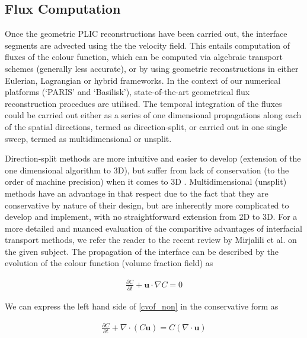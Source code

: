 \subsection*{Flux Computation}
Once the geometric PLIC reconstructions have been carried out, 
the interface segments are advected using the the velocity field. 
This entails computation of fluxes of the colour function, which 
can be computed via algebraic transport schemes (generally less accurate), 
or by using geometric reconstructions in either Eulerian, Lagrangian or hybrid frameworks.
In the context of our numerical platforms (`PARIS' and `Basilisk'), 
state-of-the-art   
geometrical flux reconstruction procedues are utilised. 
The temporal integration of the fluxes could be carried out either as a 
series of one dimensional propagations along each of the spatial directions, 
termed as direction-split, or carried out in one single sweep, 
termed as multidimensional or unsplit.

Direction-split methods are more intuitive and easier to develop 
(extension of the one dimensional algorithm to 3D), 
but suffer from lack of conservation (to the order of 
machine precision) when it comes to 3D . 
Multidimensional (unsplit) methods have an advantage in that respect due to the 
fact that they are conservative by nature of their design, but are inherently 
more complicated to develop and implement, with no straightforward extension from 2D to 3D.    
For a more detailed and nuanced evaluation of the comparitive advantages of 
interfacial transport methods, we refer the reader to the recent review by 
Mirjalili et al. \cite{mirjalili2017interface} on the given subject.     
The propagation of the interface can be described by the evolution of
the colour function (volume fraction field) as  

\begin{align} 
	\frac{\partial C}{\partial t} + \boldsymbol{u} \cdot \nabla C = 0  	
\label{cvof_non}
\end{align}

We can express the left hand side of \eqref{cvof_non} in the conservative form as  

\begin{align} 
	\frac{\partial C}{\partial t} + \nabla \cdot \left(C \boldsymbol{u}\right) = C \left(\nabla \cdot \boldsymbol{u}\right) 	
\label{cvof_con}
\end{align}

